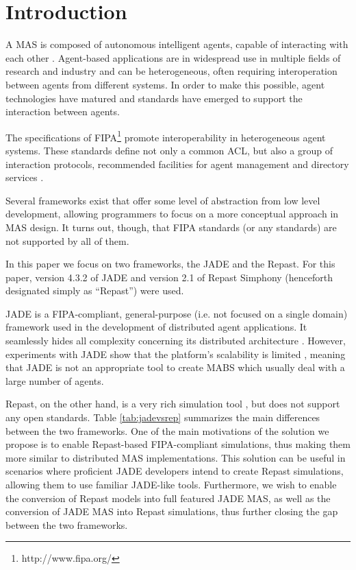 \section{Introduction} %
\label{sec:introduction}

A \gls{MAS} is composed of autonomous intelligent agents, capable of interacting with each other \cite{wooldridge2008introduction}.
Agent-based applications are in widespread use in multiple fields of research and industry and can be heterogeneous, often requiring interoperation between agents from different systems.
In order to make this possible, agent technologies have matured and standards have emerged to support the interaction between agents.

The specifications of \gls{FIPA}\footnote{http://www.fipa.org/} promote interoperability in heterogeneous agent systems.
These standards define not only a common \gls{ACL}, but also a group of interaction protocols, recommended facilities for agent management and directory services \cite{o1998fipa}.

Several frameworks exist \cite{survey,survey2} that offer some level of abstraction from low level development, allowing programmers to focus on a more conceptual approach in \gls{MAS} design.
It turns out, though, that \gls{FIPA} standards (or any standards) are not supported by all of them.

In this paper we focus on two frameworks, the \gls{JADE} and the \gls{Repast}. For this paper, version 4.3.2 of JADE and version 2.1 of Repast Simphony (henceforth designated simply as ``Repast'') were used.

\gls{JADE} is a \gls{FIPA}-compliant, general-purpose (i.e. not focused on a single domain) framework used in the development of distributed agent applications.
It seamlessly hides all complexity concerning its distributed architecture \cite{bellifemine2003JADE}.
However, experiments with \gls{JADE} show that the platform's scalability is limited \cite{mengistu2008scalability}, meaning that \gls{JADE} is not an appropriate tool to create MABS which usually deal with a large number of agents.

Repast, on the other hand, is a very rich simulation tool \cite{repSimph}, but does not support any open standards. Table \ref{tab:jadevsrep} summarizes the main differences between the two frameworks. One of the main motivations of the solution we propose is to enable Repast-based \gls{FIPA}-compliant simulations, thus making them more similar to distributed MAS implementations. This solution can be useful in scenarios where proficient JADE developers intend to create Repast simulations, allowing them to use familiar JADE-like tools. 
Furthermore, we wish to enable the conversion of Repast models into full featured \gls{JADE} MAS, as well as the conversion of \gls{JADE} MAS into Repast simulations, thus further closing the gap between the two frameworks.

